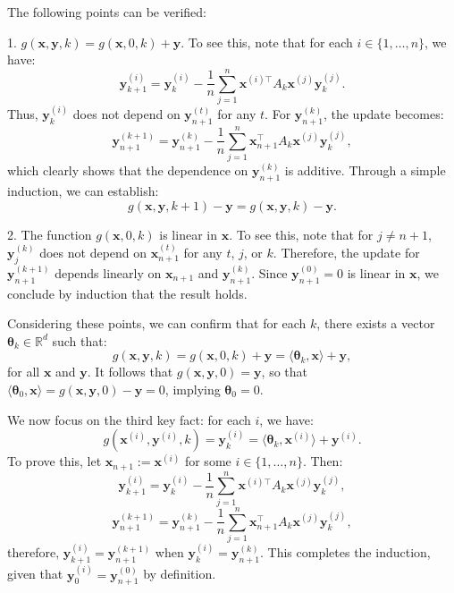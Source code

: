 \documentclass[11pt]{article}
\numberwithin{equation}{section}
\begin{document}
The following points can be verified:

1. \( g(\mathbf{x}, \mathbf{y}, k) = g(\mathbf{x}, 0, k) + \mathbf{y} \). To see this, note that for each \( i \in \{1, \dots, n\} \), we have:
\[
\mathbf{y}^{(i)}_{k+1} = \mathbf{y}^{(i)}_k - \frac{1}{n} \sum_{j=1}^{n} \mathbf{x}^{(i)\top} A_k \mathbf{x}^{(j)} \mathbf{y}^{(j)}_k.
\]
Thus, \( \mathbf{y}^{(i)}_k \) does not depend on \( \mathbf{y}_{n+1}^{(t)} \) for any \( t \). For \( \mathbf{y}_{n+1}^{(k)} \), the update becomes:
\[
\mathbf{y}_{n+1}^{(k+1)} = \mathbf{y}_{n+1}^{(k)} - \frac{1}{n} \sum_{j=1}^{n} \mathbf{x}_{n+1}^\top A_k \mathbf{x}^{(j)} \mathbf{y}^{(j)}_k,
\]
which clearly shows that the dependence on \( \mathbf{y}_{n+1}^{(k)} \) is additive. Through a simple induction, we can establish:
\[
g(\mathbf{x}, \mathbf{y}, k+1) - \mathbf{y} = g(\mathbf{x}, \mathbf{y}, k) - \mathbf{y}.
\]

2. The function \( g(\mathbf{x}, 0, k) \) is linear in \( \mathbf{x} \). To see this, note that for \( j \neq n+1 \), \( \mathbf{y}_j^{(k)} \) does not depend on \( \mathbf{x}_{n+1}^{(t)} \) for any \( t \), \( j \), or \( k \). Therefore, the update for \( \mathbf{y}_{n+1}^{(k+1)} \) depends linearly on \( \mathbf{x}_{n+1} \) and \( \mathbf{y}_{n+1}^{(k)} \). Since \( \mathbf{y}_{n+1}^{(0)} = 0 \) is linear in \( \mathbf{x} \), we conclude by induction that the result holds.

Considering these points, we can confirm that for each \( k \), there exists a vector \( \mathbf{\theta}_k \in \mathbb{R}^d \) such that:
\[
g(\mathbf{x}, \mathbf{y}, k) = g(\mathbf{x}, 0, k) + \mathbf{y} = \langle \mathbf{\theta}_k, \mathbf{x} \rangle + \mathbf{y},
\]
for all \( \mathbf{x} \) and \( \mathbf{y} \). It follows that \( g(\mathbf{x}, \mathbf{y}, 0) = \mathbf{y} \), so that \( \langle \mathbf{\theta}_0, \mathbf{x} \rangle = g(\mathbf{x}, \mathbf{y}, 0) - \mathbf{y} = 0 \), implying \( \mathbf{\theta}_0 = 0 \).

We now focus on the third key fact: for each \( i \), we have:
\[
g(\mathbf{x}^{(i)}, \mathbf{y}^{(i)}, k) = \mathbf{y}^{(i)}_k = \langle \mathbf{\theta}_k, \mathbf{x}^{(i)} \rangle + \mathbf{y}^{(i)}.
\]
To prove this, let \( \mathbf{x}_{n+1} := \mathbf{x}^{(i)} \) for some \( i \in \{1, \dots, n\} \). Then:
\[
\mathbf{y}^{(i)}_{k+1} = \mathbf{y}^{(i)}_k - \frac{1}{n} \sum_{j=1}^{n} \mathbf{x}^{(i)\top} A_k \mathbf{x}^{(j)} \mathbf{y}^{(j)}_k,
\]
\[
\mathbf{y}_{n+1}^{(k+1)} = \mathbf{y}_{n+1}^{(k)} - \frac{1}{n} \sum_{j=1}^{n} \mathbf{x}_{n+1}^\top A_k \mathbf{x}^{(j)} \mathbf{y}^{(j)}_k,
\]
therefore, \( \mathbf{y}^{(i)}_{k+1} = \mathbf{y}_{n+1}^{(k+1)} \) when \( \mathbf{y}^{(i)}_k = \mathbf{y}_{n+1}^{(k)} \). This completes the induction, given that \( \mathbf{y}^{(i)}_0 = \mathbf{y}_{n+1}^{(0)} \) by definition.
\end{document}
